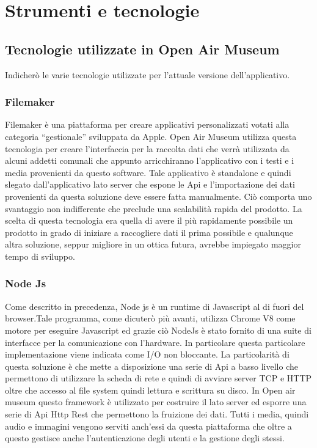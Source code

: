 \chapter{Strumenti e tecnologie}
\label{cha:intro}
\vspace{5mm}

\section{Tecnologie utilizzate in Open Air Museum}\vspace{5mm}

Indicherò le varie tecnologie utilizzate per l'attuale versione dell'applicativo.\vspace{5mm}

\subsection{Filemaker}\vspace{5mm}

Filemaker è una piattaforma per creare applicativi personalizzati votati alla categoria “gestionale” sviluppata da Apple. Open Air Museum utilizza questa tecnologia per creare l’interfaccia per la raccolta dati che verrà utilizzata da alcuni addetti comunali che appunto arricchiranno l’applicativo con i testi e i media provenienti da questo software. Tale applicativo è standalone e quindi slegato dall’applicativo lato server che espone le Api e l’importazione dei dati provenienti da questa soluzione deve essere fatta manualmente. Ciò comporta uno svantaggio non indifferente che preclude una scalabilità rapida del prodotto. La scelta di questa tecnologia era quella di avere il più rapidamente possibile un prodotto in grado di iniziare a raccogliere dati il prima possibile e qualunque altra soluzione, seppur migliore in un ottica futura, avrebbe impiegato maggior tempo di sviluppo.\vspace{5mm}

\subsection{Node Js}\vspace{5mm}

	Come descritto in precedenza, Node js è un runtime di Javascript al di fuori del browser.Tale programma, come dicuterò più avanti, utilizza Chrome V8\cite{V8} come motore per eseguire Javascript ed grazie ciò NodeJs è stato fornito di una suite di interfacce per la comunicazione con l'hardware. In particolare questa particolare implementazione viene indicata come I/O non bloccante\cite{AsincIO}. La particolarità di questa soluzione è che mette a disposizione una serie di Api a basso livello che permettono di utilizzare la scheda di rete e quindi di avviare server TCP e HTTP oltre che accesso al file system quindi lettura e scrittura su disco. In Open air museum questo framework è utilizzato per costruire il lato server ed esporre una serie di Api Http Rest che permettono la fruizione dei dati. Tutti i media, quindi audio e immagini vengono serviti anch’essi da questa piattaforma che oltre a questo gestisce anche l’autenticazione degli utenti e la gestione degli stessi. \vspace{5mm}
	
